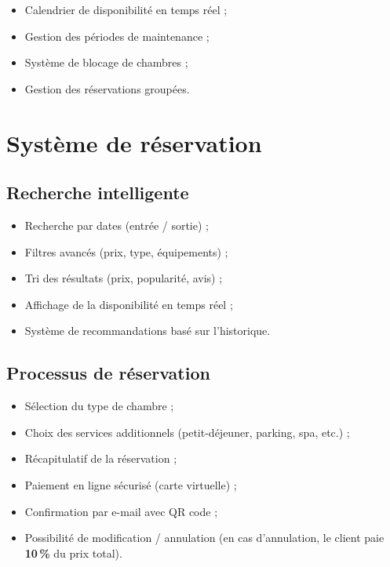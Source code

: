 \documentclass[12pt,a4paper]{report}
\begin{document}
\begin{itemize}
  \item Calendrier de disponibilité en temps réel ;
  \item Gestion des périodes de maintenance ;
  \item Système de blocage de chambres ;
  \item Gestion des réservations groupées.
\end{itemize}

\section{Système de réservation}

\subsection{Recherche intelligente}

\begin{itemize}
  \item Recherche par dates (entrée / sortie) ;
  \item Filtres avancés (prix, type, équipements) ;
  \item Tri des résultats (prix, popularité, avis) ;
  \item Affichage de la disponibilité en temps réel ;
  \item Système de recommandations basé sur l'historique.
\end{itemize}

\subsection{Processus de réservation}

\begin{itemize}
  \item Sélection du type de chambre ;
  \item Choix des services additionnels (petit-déjeuner, parking, spa, etc.) ;
  \item Récapitulatif de la réservation ;
  \item Paiement en ligne sécurisé (carte virtuelle) ;
  \item Confirmation par e-mail avec QR code ;
  \item Possibilité de modification / annulation (en cas d'annulation, le client paie \textbf{10\,\%} du prix total).
\end{itemize}
\end{document}
